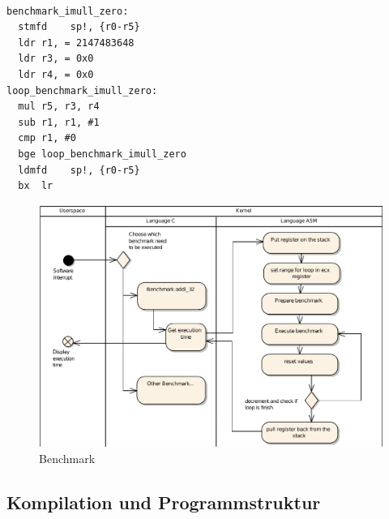 \lstset{language=[x64]Assembler}
\begin{lstlisting}

benchmark_imull_zero:
  stmfd    sp!, {r0-r5}
  ldr r1, = 2147483648
  ldr r3, = 0x0
  ldr r4, = 0x0
loop_benchmark_imull_zero:
  mul r5, r3, r4
  sub r1, r1, #1
  cmp r1, #0
  bge loop_benchmark_imull_zero
  ldmfd    sp!, {r0-r5}
  bx  lr
\end{lstlisting}



\begin{figure}[H]
\centering
\includegraphics[width=1.0\textwidth]{images/benchmark_ea.pdf}
\caption{Benchmark}
\label{fig:Benchmark}
\end{figure}

\subsection{Kompilation und Programmstruktur}


